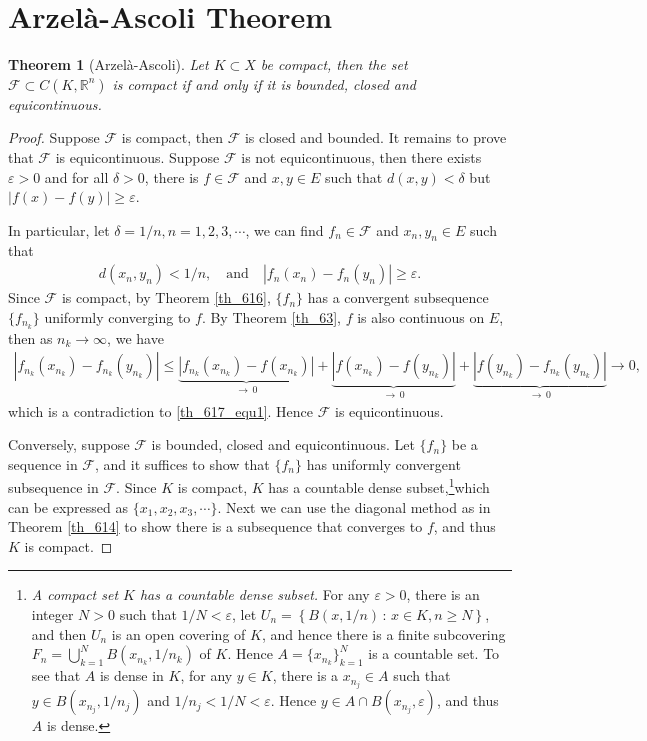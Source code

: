 \documentclass[11pt]{book}
\newtheorem{theorem}{Theorem}[chapter]
\theoremstyle{definition}
\numberwithin{equation}{chapter}
\begin{document}
\medskip




\section{Arzelà-Ascoli Theorem}

\begin{theorem}[Arzelà-Ascoli]\label{th_617}
Let $K \subset X$ be compact, then the set $\mathcal{F} \subset C(K,\mathbb{R}^n)$ is compact if and only if it is bounded, closed and equicontinuous.
\end{theorem}
\begin{proof}
Suppose $\mathcal{F}$ is compact, then $\mathcal{F}$ is closed and bounded. It remains to prove that $\mathcal{F}$ is equicontinuous. Suppose $\mathcal{F}$ is not equicontinuous, then there exists $\varepsilon > 0$ and for all $\delta > 0$, there is $f \in \mathcal{F}$ and $x, y \in E$ such that $d(x,y) < \delta$ but $\left|f(x) - f(y)\right| \geq \varepsilon$. 

In particular, let $\delta = 1/n, n = 1,2,3,\cdots$, we can find $f_n \in \mathcal{F}$ and $x_n, y_n \in E$ such that
\begin{align}\label{th_617_equ1}
    d(x_n,y_n) < 1/n, \quad \text{and} \quad \left|f_n(x_n) - f_n(y_n)\right| \geq \varepsilon.
\end{align}
Since $\mathcal{F}$ is compact, by Theorem \ref{th_616}, $\{f_n\}$ has a convergent subsequence $\{f_{n_k}\}$ uniformly converging to $f$. By Theorem \ref{th_63}, $f$ is also continuous on $E$, then as $n_k \to \infty$, we have
\begin{align*}
    \left|f_{n_k}(x_{n_k}) - f_{n_k}(y_{n_k})\right| \leq \underbrace{\left|f_{n_k}(x_{n_k}) - f(x_{n_k})\right|}_{\to\,0} + \underbrace{\left|f(x_{n_k}) - f(y_{n_k})\right|}_{\to\,0} + \underbrace{\left|f(y_{n_k}) - f_{n_k}(y_{n_k})\right|}_{\to\,0} \to 0,
\end{align*}
which is a contradiction to \eqref{th_617_equ1}. Hence $\mathcal{F}$ is equicontinuous.

Conversely, suppose $\mathcal{F}$ is bounded, closed and equicontinuous. Let $\{f_n\}$ be a sequence in $\mathcal{F}$, and it suffices to show that $\{f_n\}$ has uniformly convergent subsequence in $\mathcal{F}$. Since $K$ is compact, $K$ has a countable dense subset,\footnote{{\em A compact set $K$ has a countable dense subset.} For any $\varepsilon > 0$, there is an integer $N > 0$ such that $1/N < \varepsilon$, let $U_n = \left\{B(x,1/n) \,:\, x \in K, n \geq N\right\}$, and then $U_n$ is an open covering of $K$, and hence there is a finite subcovering $F_n = \bigcup^N_{k=1} B(x_{n_k},1/n_k)$ of $K$. Hence $A = \{x_{n_k}\}^N_{k=1}$ is a countable set. To see that $A$ is dense in $K$, for any $y \in K$, there is a $x_{n_j} \in A$ such that $y \in B(x_{n_j},1/n_j)$ and $1/n_j < 1/N < \varepsilon$. Hence $y \in A \cap B(x_{n_j}, \varepsilon)$, and thus $A$ is dense.}which can be expressed as $\{x_1, x_2, x_3, \cdots\}$. Next we can use the diagonal method as in Theorem \ref{th_614} to show there is a subsequence that converges to $f$, and thus $K$ is compact.
\end{proof}
\end{document}
